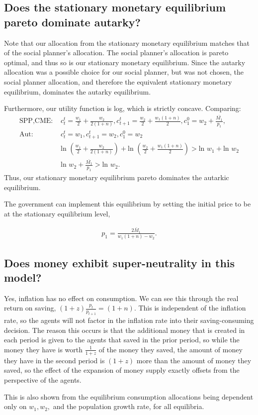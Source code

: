 \documentclass[11pt]{article} %
\begin{document}
\subsection{Does the stationary monetary equilibrium pareto dominate autarky?}
Note that our allocation from the stationary monetary equilibrium matches that of the social planner's allocation. The social planner's allocation is pareto optimal, and thus so is our stationary monetary equilibrium. Since the autarky allocation was a possible choice for our social planner, but was not chosen, the social planner allocation, and therefore the equivalent stationary monetary equilibrium, dominates the autarky equilibrium.

Furthermore, our utility function is log, which is strictly concave. Comparing:
\begin{align*}
\text{SPP,CME: }& c_t^t = \frac{w_1}{2} + \frac{w_2}{2(1+n)},  c_{t+1}^t = \frac{w_2}{2} + \frac{w_1(1+n)}{2}, c_1^0 = w_2 + \frac{\bar{M_1}}{p_1},\\
\text{Aut: }& c_t^t = w_1, c_{t+1}^t = w_2, c_1^0 = w_2 \\
&\text{ln }  (\frac{w_1}{2} + \frac{w_2}{2(1+n)}) + \text{ln } (\frac{w_2}{2} + \frac{w_1(1+n)}{2}) > \text{ln } w_1+ \text{ln } w_2\\
&\text{ln }  w_2 + \frac{\bar{M_1}}{p_1} > \text{ln } w_2.
\end{align*}
Thus, our stationary monetary equilibrium pareto dominates the autarkic equilibrium.

The government can implement this equilibrium by setting the initial price to be at the stationary equilibrium level,

\begin{align*}
p_1 =  \frac{2\bar{M}_1}{w_1(1+n) - w_2}.
\end{align*}

\subsection{Does money exhibit super-neutrality in this model?}

Yes, inflation has no effect on consumption. We can see this through the real return on saving, $(1+z)\frac{p_t}{p_{t+1}} = (1+n)$. This is independent of the inflation rate, so the agents will not factor in the inflation rate into their saving-consuming decision. The reason this occurs is that the additional money that is created in each period is given to the agents that saved in the prior period, so while the money they have is worth $\frac{1}{1+z}$ of the money they saved, the amount of money they have in the second period is $(1+z)$ more than the amount of money they saved, so the effect of the expansion of money supply exactly offsets from the perspective of the agents. 

This is also shown from the equilibrium consumption allocations being dependent only on $w_1,w_2,$ and the population growth rate, for all equilibria.
\end{document}
